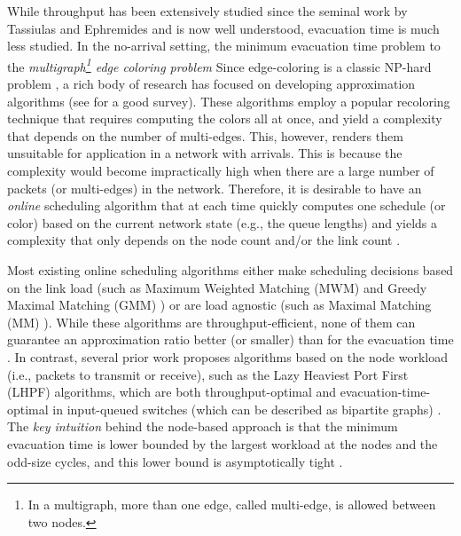 \documentclass[10pt,journal,compsoc]{IEEEtran}
\newcommand{\HIGH}[1]{{\color{black}{#1}}}
\newcommand{\high}[1]{{\color{black}{#1}}}
\begin{document}
While throughput has been extensively studied since the seminal work by Tassiulas and Ephremides 
\cite{tassiulas92} and is now well understood, evacuation time is much less studied. In the no-arrival 
setting, the minimum evacuation time problem \high{is equivalent} to the \emph{multigraph\footnote{In 
a multigraph, more than one edge, called multi-edge, is allowed between two nodes.} edge coloring problem}
\HIGH{due to the following: each multi-edge corresponds to a packet waiting to be transmitted over the link 
between the nodes of the multi-edge; each color corresponds to a feasible schedule (or a matching); finding 
the chromatic index (i.e., the minimum number of colors such that, each multi-edge is assigned a color and 
two multi-edges sharing a common node cannot have the same color) is equivalent to minimizing the time 
for evacuating all the packets by finding a matching at a time.}
Since edge-coloring is a classic NP-hard problem \cite{holyer81}, a rich body of research has focused on 
developing approximation algorithms (see \cite{stiebitz12} for a good survey). 
These algorithms employ a popular recoloring technique that requires computing the colors all at once, 
and yield a complexity that depends on the number of multi-edges. This, however, renders them 
unsuitable for application in a network with arrivals. This is because the complexity would become 
impractically high when there are a large number of packets (or multi-edges) in the network.
Therefore, it is desirable to have an \emph{online} scheduling algorithm that at each time quickly 
computes one schedule (or color) based on the current network state (e.g., the queue lengths) and 
yields a complexity that only depends on the node count  and/or the link count .

Most existing online scheduling algorithms either make scheduling decisions based on the link load (such as 
Maximum Weighted Matching (MWM) \cite{tassiulas92} and Greedy Maximal Matching (GMM) \cite{lin06,joo09}) 
or are load agnostic (such as Maximal Matching (MM) \cite{lin06,wu07}). While these algorithms are throughput-efficient, 
none of them can guarantee an approximation ratio better (or smaller) than  for the evacuation time \cite{guptathesis}. 
In contrast, several prior work \cite{mekkittikul98,tabatabaee09,guptathesis,ji15ciss} proposes algorithms based 
on the node workload (i.e., packets to transmit or receive), such as the Lazy Heaviest Port First (LHPF) 
algorithms, which are both throughput-optimal and evacuation-time-optimal in input-queued switches (which 
can be described as bipartite graphs) \cite{guptathesis}. The \emph{key intuition} behind the node-based 
approach is that the minimum evacuation time is lower bounded by the largest workload at the nodes and 
the odd-size cycles, and this lower bound is asymptotically tight \cite{kahn96}.
\high{Hence, giving a higher priority to scheduling nodes with heavy workload leads to better evacuation time performance,
while the link-based approach that fails to respect this crucial fact results in unsatisfactory evacuation time performance.}
\end{document}
